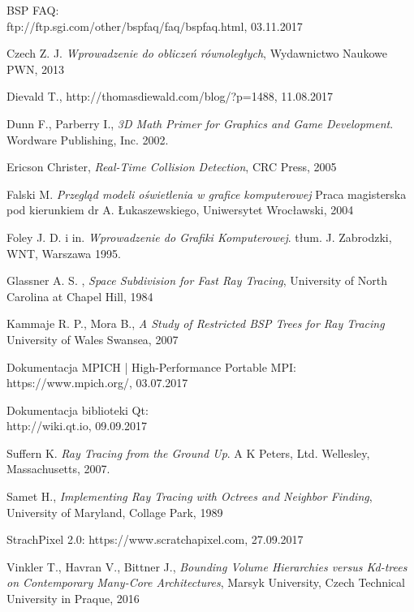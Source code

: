 \documentclass[eng,pl,printmode,openany]{mgr}
\begin{document}
%
\begin{thebibliography}{99}

	BSP FAQ: \\
	ftp://ftp.sgi.com/other/bspfaq/faq/bspfaq.html, 03.11.2017

	Czech Z. J. 
	\emph{Wprowadzenie do obliczeń równoległych},
	Wydawnictwo Naukowe PWN, 2013
	
	Dievald T., http://thomasdiewald.com/blog/?p=1488, 11.08.2017

  Dunn F., Parberry I.,
  \emph{3D Math Primer for Graphics and Game Development}.
  Wordware Publishing, Inc.
  2002.

	Ericson Christer,
	\emph{Real-Time Collision Detection},
	CRC Press, 2005
	
	Falski M. 
	\emph{Przegląd modeli oświetlenia w grafice komputerowej}
	Praca magisterska pod kierunkiem dr A. Łukaszewskiego,
	Uniwersytet Wrocławski,
	2004

  Foley J. D.  i in.
  \emph{Wprowadzenie do Grafiki Komputerowej}.
  tłum. J. Zabrodzki,
  WNT, Warszawa
  1995.
  
	Glassner A. S. ,
	\emph{Space Subdivision for Fast Ray Tracing},
	University of North Carolina at Chapel Hill,
	1984 
	
	Kammaje R. P., Mora B.,
	\emph{A Study of Restricted BSP Trees for Ray Tracing}
	University of Wales Swansea,
	2007
	
	Dokumentacja MPICH | High-Performance Portable MPI: \\
	https://www.mpich.org/, 03.07.2017 
	
	Dokumentacja biblioteki Qt: \\
	http://wiki.qt.io, 09.09.2017
  
	Suffern K. 
	\emph{Ray Tracing from the Ground Up}.
	A K Peters, Ltd.
	Wellesley, Massachusetts,
	2007.
	
	Samet H.,
	\emph{Implementing Ray Tracing with Octrees and Neighbor Finding},
	University of Maryland,
	Collage Park, 1989	
	
	StrachPixel 2.0:
	https://www.scratchapixel.com, 27.09.2017
		
	Vinkler T., Havran V., Bittner J.,
	\emph{Bounding Volume Hierarchies versus Kd-trees on Contemporary Many-Core Architectures},
	Marsyk University, Czech Technical University in Praque, 2016 
	


\end{thebibliography}
\end{document}
